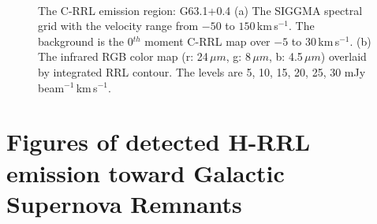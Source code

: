 \documentclass[manuscript]{aastex61}
\newcommand{\kms}{\,km\,s$^{-1}$}
\newcommand{\um}{\mu m}
\begin{document}
\begin{figure}[H]
	\centering
	\\ 
	\caption{The C-RRL emission region: G63.1+0.4
	(a) The SIGGMA spectral grid with the velocity range from $-50$ to $150$\kms.
	The background is the 0$^{th}$ moment C-RRL map over $-5$ to $30$\kms.
	(b) The infrared RGB color map (r: 24\,$\um$, g: 8\,$\um$, b: 4.5\,$\um$) overlaid by integrated RRL contour.
	The levels are 5, 10, 15, 20, 25, 30 mJy\,beam$^{-1}$\kms.}
	\label{fig_crrl-g631}
\end{figure}

\newpage

\section{Figures of detected H-RRL emission toward Galactic Supernova Remnants}\label{appe:snr}
\end{document}
